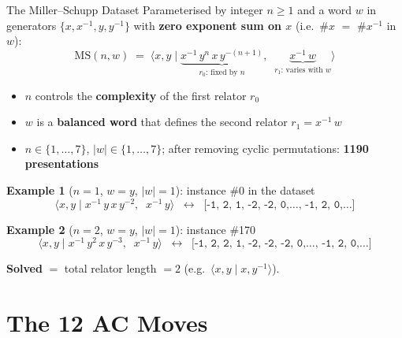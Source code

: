 \documentclass[aspectratio=169,11pt]{beamer}
\newcommand{\pres}[2]{\langle #1 \mid #2 \rangle}
\newcommand{\inv}[1]{#1^{-1}}
\begin{document}
\begin{frame}{The Miller--Schupp Dataset}
  Parameterised by integer $n \ge 1$ and a word $w$ in generators $\{x, \inv{x}, y, \inv{y}\}$
  with \textbf{zero exponent sum on $x$} (i.e.\ \#$x$ $=$ \#$\inv{x}$ in $w$):
  \[
    \mathrm{MS}(n, w) \;=\; \pres{x, y}{\underbrace{\inv{x}\, y^n\, x\, y^{-(n+1)}}_{r_0\text{: fixed by }n},\;\;
    \underbrace{\inv{x}\, w}_{r_1\text{: varies with }w}}
  \]

  \begin{itemize}
    \item $n$ controls the \textbf{complexity} of the first relator $r_0$
    \item $w$ is a \textbf{balanced word} that defines the second relator $r_1 = \inv{x}\, w$
    \item $n \in \{1, \ldots, 7\}$, $|w| \in \{1, \ldots, 7\}$; after removing cyclic
      permutations: \textbf{1190 presentations}
  \end{itemize}

  \medskip
  \textbf{Example 1} ($n{=}1$, $w{=}y$, $|w|{=}1$): instance \#0 in the dataset
  \[
    \pres{x,y}{\inv{x}\, y\, x\, y^{-2},\;\;\inv{x}\, y}
    \;\;\longleftrightarrow\;\;
    \texttt{[-1, 2, 1, -2, -2, 0,\ldots, -1, 2, 0,\ldots]}
  \]

  \textbf{Example 2} ($n{=}2$, $w{=}y$, $|w|{=}1$): instance \#170
  \[
    \pres{x,y}{\inv{x}\, y^2\, x\, y^{-3},\;\;\inv{x}\, y}
    \;\;\longleftrightarrow\;\;
    \texttt{[-1, 2, 2, 1, -2, -2, -2, 0,\ldots, -1, 2, 0,\ldots]}
  \]

  \smallskip
  \textbf{Solved} $=$ total relator length $= 2$ (e.g.\ $\pres{x,y}{x, \inv{y}}$).
\end{frame}

\section{The 12 AC Moves}
\end{document}
